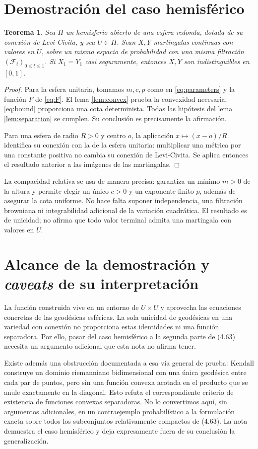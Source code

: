 \documentclass[11pt,a4paper]{article}
\newtheorem{theorem}{Teorema}
\begin{document}
\section{Demostración del caso hemisférico}
\begin{theorem}
Sea $H$ un hemisferio abierto de una esfera redonda, dotada de su conexión de Levi-Civita, y sea $U\Subset H$. Sean $X,Y$ martingalas continuas con valores en $U$, sobre un mismo espacio de probabilidad con una misma filtración $(\mathcal F_t)_{0\leq t\leq1}$. Si $X_1=Y_1$ casi seguramente, entonces $X,Y$ son indistinguibles en $[0,1]$.
\end{theorem}
\begin{proof}
Para la esfera unitaria, tomamos $m,c,p$ como en \eqref{eq:parameters} y la función $F$ de \eqref{eq:F}. El lema \ref{lem:convex} prueba la convexidad necesaria; \eqref{eq:bound} proporciona una cota determinista. Todas las hipótesis del lema \ref{lem:separation} se cumplen. Su conclusión es precisamente la afirmación.

Para una esfera de radio $R>0$ y centro $o$, la aplicación $x\mapsto(x-o)/R$ identifica su conexión con la de la esfera unitaria: multiplicar una métrica por una constante positiva no cambia su conexión de Levi-Civita. Se aplica entonces el resultado anterior a las imágenes de las martingalas.
\end{proof}

La compacidad relativa se usa de manera precisa: garantiza un mínimo $m>0$ de la altura y permite elegir un único $c>0$ y un exponente finito $p$, además de asegurar la cota uniforme. No hace falta suponer independencia, una filtración browniana ni integrabilidad adicional de la variación cuadrática. El resultado es de unicidad; no afirma que todo valor terminal admita una martingala con valores en $U$.

\section{Alcance de la demostración y \textit{caveats} de su interpretación}
La función construida vive en un entorno de $U\times U$ y aprovecha las ecuaciones concretas de las geodésicas esféricas. La sola unicidad de geodésicas en una variedad con conexión no proporciona estas identidades ni una función separadora. Por ello, pasar del caso hemisférico a la segunda parte de (4.63) necesita un argumento adicional que esta nota no afirma tener.

Existe además una obstrucción documentada a esa vía general de prueba: Kendall \cite{propeller} construye un dominio riemanniano bidimensional con una única geodésica entre cada par de puntos, pero sin una función convexa acotada en el producto que se anule exactamente en la diagonal. Esto refuta el correspondiente criterio de existencia de funciones convexas separadoras. No lo convertimos aquí, sin argumentos adicionales, en un contraejemplo probabilístico a la formulación exacta sobre todos los subconjuntos relativamente compactos de (4.63). La nota demuestra el caso hemisférico y deja expresamente fuera de su conclusión la generalización.
\end{document}

